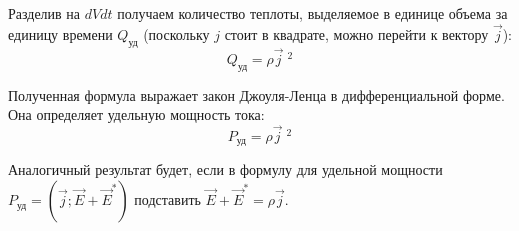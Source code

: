 \documentclass{article}
\begin{document}
	Разделив на $dVdt$ получаем количество теплоты, выделяемое в единице объема за единицу времени $Q_\text{уд}$ (поскольку $j$ стоит в квадрате, можно перейти к вектору $\vec j $):
	\begin{equation}
		Q_\text{уд} = \rho \vec j\;^2
	\end{equation}

	Полученная формула выражает закон Джоуля-Ленца в дифференциальной форме. Она определяет удельную мощность тока:
	\begin{equation}
		P_\text{уд} = \rho \vec j\;^2
	\end{equation}

	Аналогичный результат будет, если в формулу для удельной мощности $P_\text{уд} = (\vec j;\vec E + \vec E^*)$ подставить $\vec E + \vec E^* = \rho \vec j$.
\end{document}
